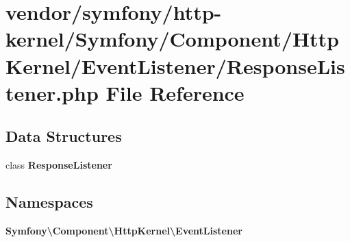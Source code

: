 \section{vendor/symfony/http-\/kernel/\+Symfony/\+Component/\+Http\+Kernel/\+Event\+Listener/\+Response\+Listener.php File Reference}
\label{symfony_2http-kernel_2_symfony_2_component_2_http_kernel_2_event_listener_2_response_listener_8php}
\subsection*{Data Structures}
\begin{DoxyCompactItemize}
\item 
class {\bf Response\+Listener}
\end{DoxyCompactItemize}
\subsection*{Namespaces}
\begin{DoxyCompactItemize}
\item 
 {\bf Symfony\textbackslash{}\+Component\textbackslash{}\+Http\+Kernel\textbackslash{}\+Event\+Listener}
\end{DoxyCompactItemize}
